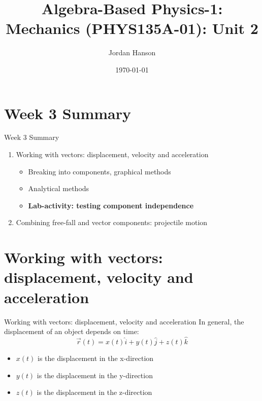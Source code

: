 \documentclass{beamer}
\title{Algebra-Based Physics-1: Mechanics (PHYS135A-01): Unit 2}
\date{\today}
\author{Jordan Hanson}
\institute{Whittier College Department of Physics and Astronomy}
\begin{document}
\maketitle

\section{Week 3 Summary}

\begin{frame}{Week 3 Summary}
\begin{enumerate}
\item Working with vectors: displacement, velocity and acceleration
\begin{itemize}
\item Breaking into components, graphical methods
\item Analytical methods
\item \textbf{Lab-activity: testing component independence}
\end{itemize}
\item Combining free-fall and vector components: \alert{projectile motion}
\end{enumerate}
\end{frame}

\section{Working with vectors: displacement, velocity and acceleration}

\begin{frame}{Working with vectors: displacement, velocity and acceleration}
In general, the displacement of an object depends on time:
\begin{equation}
\vec{r}(t) = x(t) \hat{i} + y(t) \hat{j} + z(t) \hat{k}
\end{equation}
\begin{itemize}
\item $x(t)$ is the displacement in the x-direction
\item $y(t)$ is the displacement in the y-direction
\item $z(t)$ is the displacement in the z-direction
\end{itemize}
\end{frame}
\end{document}
